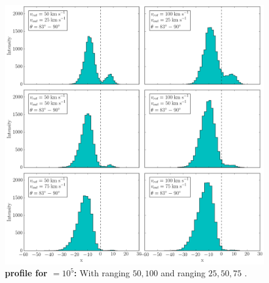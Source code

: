 \begin{figure}[h!]
	\begin{center}
		\includegraphics[width=1\textwidth]{./figures/chapter3/2_tau10E6_phi83-90}
	\end{center}
	\caption{\textbf{\lya profile for \tauh$=10^5$:} With \vrot ranging $50,100$ \kms and \vout ranging $25,50,75$ \kms.
		\label{fig:2_tau10E6_phi83-90}}
\end{figure}

\newpage

